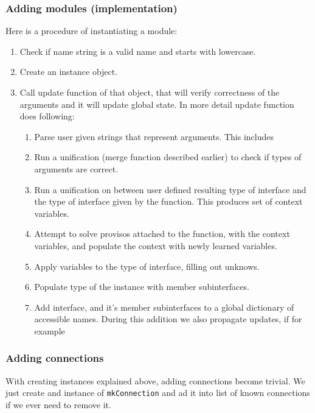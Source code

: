 \documentclass[14pt]{report}
\begin{document}
\subsubsection*{Adding modules (implementation)}
Here is a procedure of instantiating a module:
\begin{enumerate}
    \item Check if name string is a valid name and starts with lowercase.
    \item Create an instance object.
    \item Call update function of that object, that will verify correctness of the arguments and it will update global state. In more detail update function does following:
    \begin{enumerate}
        \item Parse user given strings that represent arguments. This includes 
        \item Run a unification (merge function described earlier) to check if types of arguments are correct.
        \item Run a unification on between user defined resulting type of interface and the type of interface given by the function. This produces set of context variables.
        \item Attempt to solve provisos attached to the function, with the context variables, and populate the context with newly learned variables.
        \item Apply variables to the type of interface, filling out unknows.
        \item Populate type of the instance with member subinterfaces.
        \item Add interface, and it's member subinterfaces to a global dictionary of accessible names. During this addition we also propagate updates, if for example 
    \end{enumerate}
\end{enumerate}

\subsubsection*{Adding connections}
With creating instances explained above, adding connections become trivial. We just create and instance of \verb!mkConnection! and ad it into list of known connections if we ever need to remove it.
\end{document}
